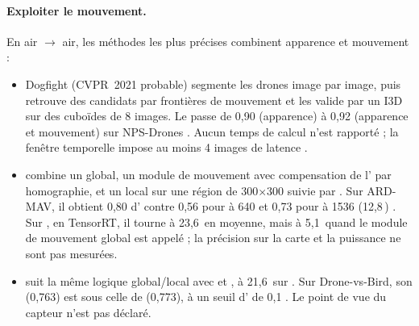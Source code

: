 \paragraph{Exploiter le mouvement.} En air $\rightarrow$ air, les méthodes les plus
précises combinent apparence et mouvement :
\begin{itemize}
  \item Dogfight \citep{arxiv-2103.17242-dogfight-detecting-drones-drones-videos}\pp{}
    (CVPR~2021 probable) segmente les drones image par image, puis retrouve des candidats
    par frontières de mouvement et les valide par un I3D sur des cuboïdes de 8 images. Le
     passe de 0,90 (apparence) à 0,92 (apparence et mouvement) sur NPS-Drones
    . Aucun temps de calcul n'est rapporté ; la fenêtre temporelle impose au
    moins 4 images de latence \deduit.
  \item {} \citep{arxiv-2312.11008-global-local-mav-detection-challenging}\pp{} combine
    un  global, un module de mouvement avec compensation de l' par
    homographie, et un  local sur une région de 300$\times$300 suivie par . Sur
    ARD-MAV, il obtient 0,80 d' contre 0,56 pour  à 640 et 0,73 pour 
    à 1536 (12,8\,) . Sur , en TensorRT, il tourne à
    23,6\, en moyenne, mais à 5,1\, quand le module de mouvement global est appelé
     ; la précision sur la carte et la puissance ne sont pas mesurées.
  \item {} \citep{arxiv-2411.02582-real-time-detection-small-uavs}\pp{} suit la même
    logique global/local avec  et , à 21,6\, sur 
    . Sur Drone-vs-Bird, son  (0,763) est sous celle de  (0,773), à un
    seuil d' de 0,1 . Le point de vue du capteur n'est pas déclaré.
\end{itemize}
